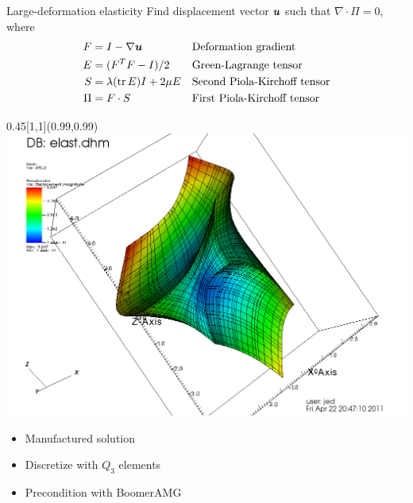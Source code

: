 \documentclass{beamer}
\begin{document}
\begin{frame}{Large-deformation elasticity}
  Find displacement vector $\bm u$ such that $\nabla \cdot \Pi = 0$, where
  \begin{align*}
    F   & = I - \nabla \bm u                &  & \text{Deformation gradient}  \\
    E   & = (F^T F - I)/2                 &  & \text{Green-Lagrange tensor} \\
    S   & = \lambda (\operatorname{tr} E) I + 2\mu E &  & \text{Second Piola-Kirchoff tensor} \\
    \Pi & = F \cdot S                     &  & \text{First Piola-Kirchoff tensor}
  \end{align*}
  \begin{textblock}{0.45}[1,1](0.99,0.99)
    \includegraphics[width=\textwidth]{figures/elast-b4q5}
  \end{textblock}
  \begin{itemize}
  \item Manufactured solution
  \item Discretize with $Q_3$ elements
  \item Precondition with BoomerAMG
  \end{itemize}
\end{frame}
\end{document}
